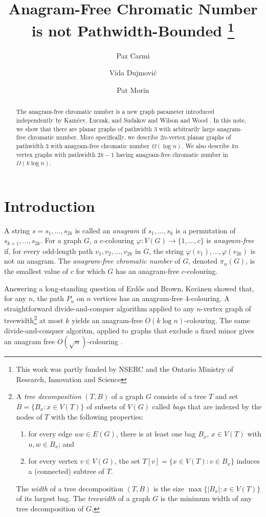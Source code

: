 \documentclass{llncs}
\title{Anagram-Free Chromatic Number \newline is not Pathwidth-Bounded%
   \thanks{This work was partly funded by NSERC and the Ontario Ministry of
    Research, Innovation and Science}}
\author{Paz Carmi\inst{1}%
    \and Vida Dujmović\inst{2}
    \and Pat Morin\inst{3}}
\institute{Department of Computer Science,
           Ben-Gurion University of the Negev 
          \and School of Computer Science and Electrical Engineering, 
           University of Ottawa
          \and School of Computer Science, Carleton University}
\begin{document}
\maketitle
%
\begin{abstract}
  The anagram-free chromatic number is a new graph parameter
  introduced independently by Kamčev, Łuczak, and Sudakov
  \cite{kamcev.luczak.ea:anagram-free} and Wilson and Wood
  \cite{wilson.wood:anagram-free}.  In this note, we show that there
  are planar graphs of pathwidth 3 with arbitrarily large anagram-free
  chromatic number.  More specifically, we describe $2n$-vertex planar
  graphs of pathwidth 3 with anagram-free chromatic number $\Omega(\log n)$.
  We also describe $kn$ vertex graphs with pathwidth $2k-1$ having
  anagram-free chromatic number in $\Omega(k\log n)$.
\end{abstract}
%
%


\section{Introduction}

A string $s=s_1,\ldots,s_{2k}$ is called an \emph{anagram} if
$s_1,\ldots,s_k$ is a permutation of $s_{k+1},\ldots,s_{2k}$.
For a graph $G$, a $c$-colouring $\varphi:V(G)\to\{1,\ldots,c\}$ is
\emph{anagram-free} if, for every odd-length path $v_1,v_2,\ldots,v_{2k}$
in $G$, the string $\varphi(v_1),\ldots,\varphi(v_{2k})$ is not an
anagram.  The \emph{anagram-free chromatic number} of $G$, denoted
$\pi_\alpha(G)$, is the smallest value of $c$ for which $G$ has an
anagram-free $c$-colouring.

Answering a long-standing question of Erd\H{o}s and Brown, Ker\"anen
\cite{keranen:abelian} showed that, for any $n$, the path $P_n$ on
$n$ vertices has an anagram-free 4-colouring.  A straightforward
divide-and-conquer algorithm applied to any $n$-vertex graph of
treewidth\footnote{A \emph{tree decomposition} $(T,B)$ of a graph $G$ consists of a tree $T$ and set $B=\{B_x : x\in V(T)\}$ of subsets of $V(G)$ called \emph{bags} that are indexed by the nodes of $T$ with the following properties:
\begin{enumerate}
   \item  for every edge $uw\in E(G)$, there is at least one bag $B_x$, $x\in V(T)$ with $u,w\in B_x$; and
   \item for every vertex $v\in V(G)$, the set $T[v]=\{x\in V(T): v\in B_x\}$ induces a (connected) subtree of $T$.
\end{enumerate}
The \emph{width} of a tree decomposition $(T,B)$ is the size $\max\{|B_x|:x\in V(T)\}$ of its largest bag.  The \emph{treewidth} of a graph $G$ is the minimum width of any tree decomposition of $G$.}
 at most $k$ yields an anagram-free $O(k\log n)$-colouring.
The same divide-and-conquer algoritm, applied to graphs that
exclude a fixed minor gives an anagram free $O(\sqrt{n})$-colouring
\cite{kamcev.luczak.ea:anagram-free}.  
\end{document}
